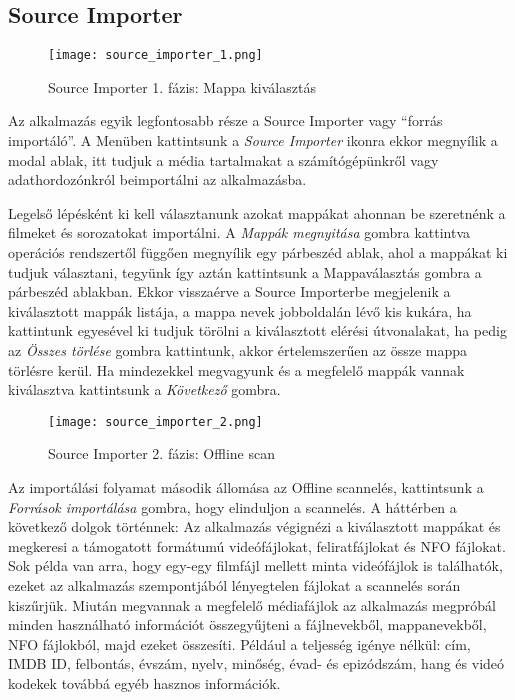 \subsection{Source Importer}
\begin{figure}[H]
	\centering
	\texttt{[image: source\_importer\_1.png]}
	\caption{Source Importer 1. fázis: Mappa kiválasztás}
	\label{fig:source_importer_1}
\end{figure}
Az alkalmazás egyik legfontosabb része a Source Importer vagy ``forrás importáló''. A Menüben kattintsunk a {\it Source Importer} ikonra ekkor megnyílik a modal ablak, itt tudjuk a média tartalmakat a számítógépünkről vagy adathordozónkról beimportálni az alkalmazásba.

Legelső lépésként ki kell választanunk azokat mappákat ahonnan be szeretnénk a filmeket és sorozatokat importálni. A {\it Mappák megnyitása} gombra kattintva operációs rendszertől függően megnyílik egy párbeszéd ablak, ahol a mappákat ki tudjuk választani, tegyünk így aztán kattintsunk a Mappaválasztás gombra a párbeszéd ablakban. Ekkor visszaérve a Source Importerbe megjelenik a kiválasztott mappák listája, a mappa nevek jobboldalán lévő kis kukára, ha kattintunk egyesével ki tudjuk törölni a kiválasztott elérési útvonalakat, ha pedig az {\it Összes törlése} gombra kattintunk, akkor értelemszerűen az össze mappa törlésre kerül. Ha mindezekkel megvagyunk és a megfelelő mappák vannak kiválasztva kattintsunk a {\it Következő} gombra.

\begin{figure}[H]
	\centering
	\texttt{[image: source\_importer\_2.png]}
	\caption{Source Importer 2. fázis: Offline scan}
	\label{fig:source_importer_2}
\end{figure}
Az importálási folyamat második állomása az Offline scannelés, kattintsunk a {\it Források importálása} gombra, hogy elinduljon a scannelés. A háttérben a következő dolgok történnek: Az alkalmazás végignézi a kiválasztott mappákat és megkeresi a támogatott formátumú videófájlokat, feliratfájlokat és NFO fájlokat. Sok példa van arra, hogy egy-egy filmfájl mellett minta videófájlok is találhatók, ezeket az alkalmazás szempontjából lényegtelen fájlokat a scannelés során kiszűrjük. Miután megvannak a megfelelő médiafájlok az alkalmazás megpróbál minden használható információt összegyűjteni a fájlnevekből, mappanevekből, NFO fájlokból, majd ezeket összesíti. Például a teljesség igénye nélkül: cím, IMDB ID, felbontás, évszám, nyelv, minőség, évad- és epizódszám, hang és videó kodekek továbbá egyéb hasznos információk.

